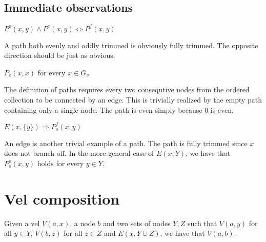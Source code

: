 \subsection{Immediate observations}
\label{sub:Immediate observations}
\begin{lemma}
  $P^o(x,y) \wedge P^e(x,y) \Leftrightarrow P^f(x,y)$
\end{lemma}
A path both evenly and oddly trimmed is obviously fully trimmed.
The opposite direction should be just as obvious.
\begin{lemma}
  $P_e(x,x)$ for every $x \in G_v$
\end{lemma}
The definition of paths requires every two consequtive nodes from the ordered collection to be connected by an edge.
This is trivially realized by the empty path containing only a single node.
The path is even simply because 0 is even.
\begin{lemma}
  $E(x,\{ y \}) \Rightarrow P^f_o(x,y)$
\end{lemma}
An edge is another trivial example of a path.
The path is fully trimmed since $x$ does not branch off.
In the more general case of $E(x,Y)$, we have that $P^o_o(x,y)$ holds for every $y \in Y$.
\section{Vel composition}
\label{sec:Vel composition}
\begin{theorem}
  Given a vel $V(a,x)$, a node $b$ and two sets of nodes $Y,Z$ such that $V(a,y)$ for all $y \in Y$, $V(b,z)$ for all $z \in Z$ and $E(x,Y \cup Z)$, we have that $V(a,b)$.
\end{theorem}
